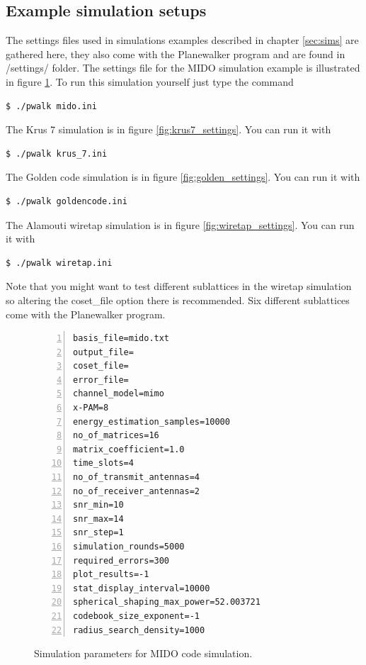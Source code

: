 \documentclass[english,12pt,a4paper,pdftex,sci,utf8]{aaltothesis}
\begin{document}
\subsection{Example simulation setups}
The settings files used in simulations examples described in chapter \ref{sec:sims} are gathered here, they also come with the Planewalker program and are found in /settings/ folder.
The settings file for the MIDO simulation example is illustrated in figure \ref{fig:mido_settings}. To run this simulation yourself just type the command
\begin{verbatim}
$ ./pwalk mido.ini
\end{verbatim}
The Krus 7 simulation is in figure \ref{fig:krus7_settings}. You can run it with
\begin{verbatim}
$ ./pwalk krus_7.ini
\end{verbatim}
The Golden code simulation is in figure \ref{fig:golden_settings}. You can run it with
\begin{verbatim}
$ ./pwalk goldencode.ini
\end{verbatim}
The Alamouti wiretap simulation is in figure \ref{fig:wiretap_settings}. You can run it with
\begin{verbatim}
$ ./pwalk wiretap.ini
\end{verbatim}
Note that you might want to test different sublattices in the wiretap simulation so altering the coset\_file option there is recommended. Six different sublattices come with the Planewalker program.

\begin{figure}[htb]
\begin{Verbatim}[frame=single, numbers=left]
basis_file=mido.txt
output_file=
coset_file=
error_file= 
channel_model=mimo            
x-PAM=8                         
energy_estimation_samples=10000   
no_of_matrices=16                
matrix_coefficient=1.0         
time_slots=4                    
no_of_transmit_antennas=4      
no_of_receiver_antennas=2    
snr_min=10                      
snr_max=14                    
snr_step=1                    
simulation_rounds=5000       
required_errors=300              
plot_results=-1    
stat_display_interval=10000        
spherical_shaping_max_power=52.003721
codebook_size_exponent=-1     
radius_search_density=1000
\end{Verbatim}
\caption{Simulation parameters for MIDO code simulation.}
\label{fig:mido_settings}
\end{figure}
\end{document}
